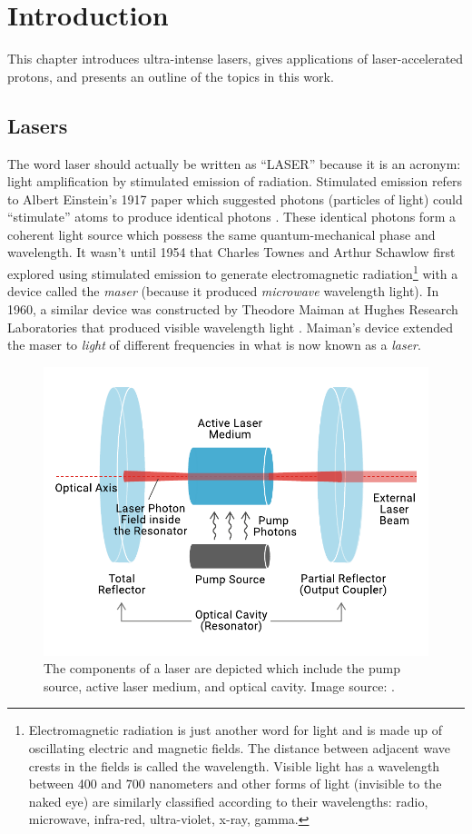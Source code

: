 \chapter{Introduction} \label{ch:1}
This chapter introduces ultra-intense lasers, gives applications of laser-accelerated protons, and presents an outline of the topics in this work.

\section{Lasers} \label{sec:lasers}

The word laser should actually be written as ``LASER'' because it is an acronym: light amplification by stimulated emission of radiation. Stimulated emission refers to Albert Einstein's 1917 paper which suggested photons (particles of light) could ``stimulate'' atoms to produce identical photons \cite{Einstein_1917_Quantum}. These identical photons form a coherent light source which possess the same quantum-mechanical phase and wavelength. It wasn't until 1954 that Charles Townes and Arthur Schawlow first explored using stimulated emission to generate electromagnetic radiation\footnote{Electromagnetic radiation is just another word for light and is made up of oscillating electric and magnetic fields. The distance between adjacent wave crests in the fields is called the wavelength. Visible light has a wavelength between 400 and 700 nanometers and other forms of light (invisible to the naked eye) are similarly classified according to their wavelengths: radio, microwave, infra-red, ultra-violet, x-ray, gamma.} with a device called the \emph{maser} (because it produced \emph{microwave} wavelength light). In 1960, a similar device was constructed by Theodore Maiman at Hughes Research Laboratories that produced visible wavelength light \cite{Maiman_1960_Nature}. Maiman's device extended the maser to \emph{light} of different frequencies in what is now known as a \emph{laser}.

\begin{figure}
	\centering
	\includegraphics[width=0.75\linewidth]{planning/images/laser_gain.pdf}
	\caption{The components of a laser are depicted which include the pump source, active laser medium, and optical cavity. Image source: \cite{MeetOpticsPost}.}
	\label{fig:laser_gain}
\end{figure}


